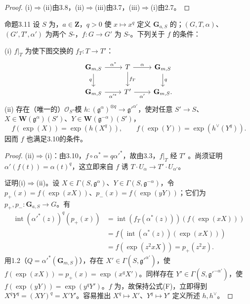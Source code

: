 \begin{proof}(i)$\Rightarrow$(ii)由3.8，(ii)$\Rightarrow$(iii)由3.7，(iii)$\Rightarrow$(i)由2.7。\end{proof}
\begin{SGAresult}{命题}{3.11}
设 $S$ 为，$a\in\mathbf Z$，$q>0$ 使 $x\mapsto x^q$ 定义 $\mathbf G_{a,S}$ 的；$(G,T,\alpha)$、$(G',T',\alpha')$ 为两个 $S$-，$f:G\to G'$ 为 $S$-。下列关于 $f$ 的条件：

(i) $f|_T$ 为使下图交换的 $f_T:T\to T'$：
\[\begin{tikzcd}\mathbf G_{m,S}\arrow[r,"\alpha^*"]\arrow[d,"q"']&T\arrow[r,"\alpha"]\arrow[d,"f_T"]&\mathbf G_{m,S}\arrow[d,"q"]\\\mathbf G_{m,S}\arrow[r,"\alpha'^*"']&T'\arrow[r,"\alpha'"']&\mathbf G_{m,S}.\end{tikzcd}\]
(ii) 存在（唯一的）$\mathscr O_S$-模 $h:(\mathfrak g^\alpha)^{\otimes q}\to\mathfrak g'^{\alpha'}$，使对任意 $S'\to S$、$X\in\mathbf W(\mathfrak g^\alpha)(S')$、$Y\in\mathbf W(\mathfrak g^{-\alpha})(S')$，
\[f(\exp(X))=\exp(h(X^q)),\qquad f(\exp(Y))=\exp(h^\vee(Y^q)).\]
因而 $f$ 也满足3.10的条件。
\end{SGAresult}
\begin{proof}
(ii)$\Rightarrow$(i)：由3.10，$f\circ\alpha^*=q\alpha'^*$，故由3.3，$f|_T$ 经 $T'$ 。尚须证明 $\alpha'(f(t))=\alpha(t)^q$，这立即来自 $f$ 诱 $T\cdot U_\alpha\to T'\cdot U_{\alpha'}$。

证明(i)$\Rightarrow$(ii)。设 $X\in\Gamma(S,\mathfrak g^\alpha)$、$Y\in\Gamma(S,\mathfrak g^{-\alpha})$，令 $p_+(x)=f(\exp(xX))$、$p_-(x)=f(\exp(yY))$；它们为 $p_+,p_-:\mathbf G_{a,S}\to G$。有
\[\begin{aligned}\operatorname{int}(\alpha'^*(z))^q(p_+(x))&=\operatorname{int}(f_T(\alpha^*(z)))(f(\exp(xX)))\\&=f(\operatorname{int}(\alpha^*(z))(\exp(xX)))\\&=f(\exp(z^2xX))=p_+(z^2x).\end{aligned}\]
用1.2（$Q=\alpha'^*(\mathbf G_{m,S})$），存在 $X'\in\Gamma(S,\mathfrak g'^{\alpha'})$，使 $f(\exp(xX))=p_+(x)=\exp(x^qX')$。同样存在 $Y'\in\Gamma(S,\mathfrak g'^{-\alpha'})$，使 $f(\exp(yY))=\exp(y^qY')$。$f$ 为，故保持公式(F)，立即得到 $X^qY^q=(XY)^q=X'Y'$。容易推出 $X^q\mapsto X'$、$Y^q\mapsto Y'$ 定义所述 $h,h^\vee$。
\end{proof}
